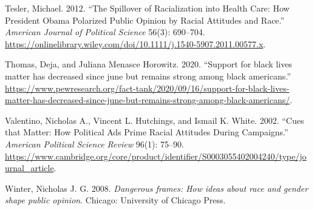 \documentclass[
  12pt,
]{article}
\newlength{\cslhangindent}
\newlength{\cslentryspacingunit} %
\newenvironment{CSLReferences}[2] %
 {%
  \setlength{\parindent}{0pt}
  \ifodd #1
  \let\oldpar\par
  \def\par{\hangindent=\cslhangindent\oldpar}
  \fi
  \setlength{\parskip}{#2\cslentryspacingunit}
 }%
 {}
\begin{document}
\begin{CSLReferences}{1}{0}
\leavevmode{}%
Tesler, Michael. 2012. {``The Spillover of Racialization into Health
Care: How President Obama Polarized Public Opinion by Racial Attitudes
and Race.''} \emph{American Journal of Political Science} 56(3):
690--704.
\url{https://onlinelibrary.wiley.com/doi/10.1111/j.1540-5907.2011.00577.x}.

\leavevmode{}%
Thomas, Deja, and Juliana Menasce Horowitz. 2020. {``Support for black
lives matter has decreased since june but remains strong among black
americans.''}
\url{https://www.pewresearch.org/fact-tank/2020/09/16/support-for-black-lives-matter-has-decreased-since-june-but-remains-strong-among-black-americans/}.

\leavevmode{}%
Valentino, Nicholas A., Vincent L. Hutchings, and Ismail K. White. 2002.
{``Cues that Matter: How Political Ads Prime Racial Attitudes During
Campaigns.''} \emph{American Political Science Review} 96(1): 75--90.
\url{https://www.cambridge.org/core/product/identifier/S0003055402004240/type/journal_article}.

\leavevmode{}%
Winter, Nicholas J. G. 2008. \emph{Dangerous frames: How ideas about
race and gender shape public opinion}. Chicago: University of Chicago
Press.

\end{CSLReferences}
\end{document}
